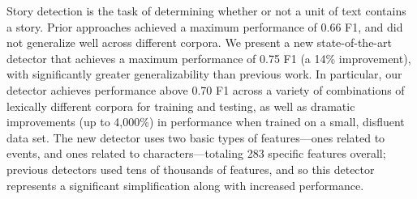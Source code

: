 Story detection is the task of determining whether or not a unit of text contains a story. Prior approaches achieved a maximum performance of 0.66 F1, and did not generalize well across different corpora. We present a new state-of-the-art detector that achieves a maximum performance of 0.75 F1 (a 14\% improvement), with significantly greater generalizability than previous work. In particular, our detector achieves performance above 0.70 F1 across a variety of combinations of lexically different corpora for training and testing, as well as dramatic improvements (up to 4,000\%) in performance when trained on a small, disfluent data set. The new detector uses two basic types of features---ones related to events, and ones related to characters---totaling 283 specific features overall; previous detectors used tens of thousands of features, and so this detector represents a significant simplification along with increased performance.
